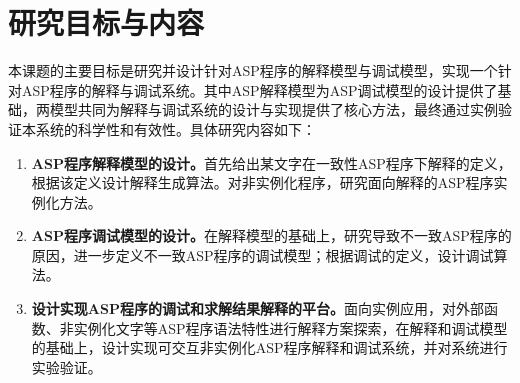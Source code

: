 \section{研究目标与内容}
本课题的主要目标是研究并设计针对ASP程序的解释模型与调试模型，实现一个针对ASP程序的解释与调试系统。其中ASP解释模型为ASP调试模型的设计提供了基础，两模型共同为解释与调试系统的设计与实现提供了核心方法，最终通过实例验证本系统的科学性和有效性。具体研究内容如下：
\begin{enumerate}[label=(\arabic*),topsep=0pt]
    \setlength\itemsep{-0.3em}
    \item \textbf{ASP程序解释模型的设计。}首先给出某文字在一致性ASP程序下解释的定义，根据该定义设计解释生成算法。对非实例化程序，研究面向解释的ASP程序实例化方法。
    \item \textbf{ASP程序调试模型的设计。}在解释模型的基础上，研究导致不一致ASP程序的原因，进一步定义不一致ASP程序的调试模型；根据调试的定义，设计调试算法。
    \item \textbf{设计实现ASP程序的调试和求解结果解释的平台。}面向实例应用，对外部函数、非实例化文字等ASP程序语法特性进行解释方案探索，在解释和调试模型的基础上，设计实现可交互非实例化ASP程序解释和调试系统，并对系统进行实验验证。
\end{enumerate}
